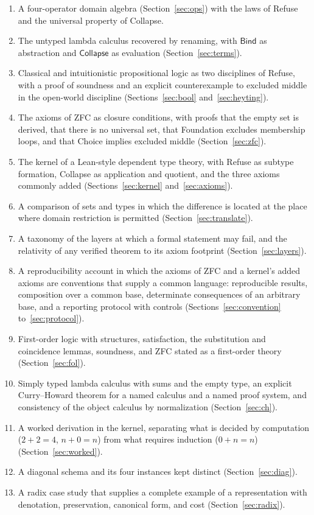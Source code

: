 \documentclass[11pt]{article}
\newcommand{\Bind}{\mathsf{Bind}}
\newcommand{\Coll}{\mathsf{Collapse}}
\theoremstyle{definition}
\theoremstyle{plain}
\theoremstyle{remark}
\begin{document}
\begin{enumerate}
\item A four-operator domain algebra (Section~\ref{sec:ops}) with the laws of Refuse and the universal property of Collapse.
\item The untyped lambda calculus recovered by renaming, with $\Bind$ as abstraction and $\Coll$ as evaluation (Section~\ref{sec:terms}).
\item Classical and intuitionistic propositional logic as two disciplines of Refuse, with a proof of soundness and an explicit counterexample to excluded middle in the open-world discipline (Sections~\ref{sec:bool} and~\ref{sec:heyting}).
\item The axioms of ZFC as closure conditions, with proofs that the empty set is derived, that there is no universal set, that Foundation excludes membership loops, and that Choice implies excluded middle (Section~\ref{sec:zfc}).
\item The kernel of a Lean-style dependent type theory, with Refuse as subtype formation, Collapse as application and quotient, and the three axioms commonly added (Sections~\ref{sec:kernel} and~\ref{sec:axioms}).
\item A comparison of sets and types in which the difference is located at the place where domain restriction is permitted (Section~\ref{sec:translate}).
\item A taxonomy of the layers at which a formal statement may fail, and the relativity of any verified theorem to its axiom footprint (Section~\ref{sec:layers}).
\item A reproducibility account in which the axioms of ZFC and a kernel's added axioms are conventions that supply a common language: reproducible results, composition over a common base, determinate consequences of an arbitrary base, and a reporting protocol with controls (Sections~\ref{sec:convention} to~\ref{sec:protocol}).
\item First-order logic with structures, satisfaction, the substitution and coincidence lemmas, soundness, and ZFC stated as a first-order theory (Section~\ref{sec:fol}).
\item Simply typed lambda calculus with sums and the empty type, an explicit Curry--Howard theorem for a named calculus and a named proof system, and consistency of the object calculus by normalization (Section~\ref{sec:ch}).
\item A worked derivation in the kernel, separating what is decided by computation ($2+2=4$, $n+0=n$) from what requires induction ($0+n=n$) (Section~\ref{sec:worked}).
\item A diagonal schema and its four instances kept distinct (Section~\ref{sec:diag}).
\item A radix case study that supplies a complete example of a representation with denotation, preservation, canonical form, and cost (Section~\ref{sec:radix}).
\end{enumerate}
\end{document}
